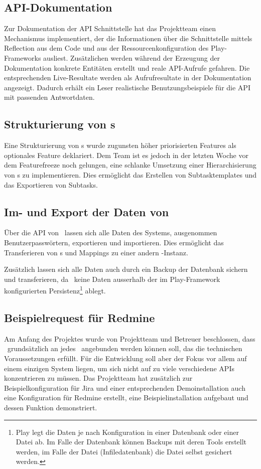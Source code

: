 		\subsection{API-Dokumentation}
			Zur Dokumentation der API Schnittstelle hat das Projektteam
			einen Mechanismus implementiert, der die Informationen über die Schnittstelle mittels Reflection aus dem Code und aus der Ressourcenkonfiguration des Play-Frameworks ausliest.
			Zusätzlichen werden während der Erzeugung der Dokumentation konkrete Entitäten erstellt und reale API-Aufrufe gefahren.
			Die entsprechenden Live-Resultate werden als Aufrufresultate in der Dokumentation angezeigt.
			Dadurch erhält ein Leser realistische Benutzungsbeispiele für die API mit passenden Antwortdaten.
			
	
		\subsection{Strukturierung von \ttpl s}
			Eine Strukturierung von \ttpl s wurde zugunsten höher priorisierten Features als optionales Feature deklariert.
			Dem Team ist es jedoch in der letzten Woche vor dem Featurefreeze noch gelungen, eine schlanke Umsetzung einer Hierarchisierung von \ttpl s zu implementieren.
			Dies ermöglicht das Erstellen von Subtasktemplates und das Exportieren von Subtasks.
			
		
		\subsection{Im- und Export der Daten von \eeppi}
			Über die API von \eeppi\ lassen sich alle Daten des Systems,
			ausgenommen Benutzerpasswörtern, exportieren und importieren.
			Dies ermöglicht das Transferieren von \ttpl s und Mappings zu einer andern \eeppi -Instanz.
			
			Zusätzlich lassen sich alle Daten auch durch ein Backup der Datenbank sichern und transferieren, da \eeppi\ keine Daten ausserhalb der im Play-Framework konfigurierten Persistenz\footnote{Play legt die Daten je nach Konfiguration in einer Datenbank oder einer Datei ab. Im Falle der Datenbank können Backups mit deren Tools erstellt werden, im Falle der Datei (Infiledatenbank) die Datei selbst gesichert werden.} ablegt.
			
			
		\subsection{Beispielrequest für Redmine}
			Am Anfang des Projektes wurde von Projektteam und Betreuer beschlossen, 
			dass \eeppi\ grundsätzlich an jedes \ppt\ angebunden werden können soll, das die technischen Voraussetzungen erfüllt.
			Für die Entwicklung soll aber der Fokus vor allem auf einem einzigen System liegen, um sich nicht auf zu viele verschiedene APIs konzentrieren zu müssen.
			Das Projektteam hat zusätzlich zur Beispielkonfiguration für Jira und einer entsprechenden Demoinstallation auch eine Konfiguration für Redmine erstellt, eine Beispielinstallation aufgebaut und dessen Funktion demonstriert.
	
